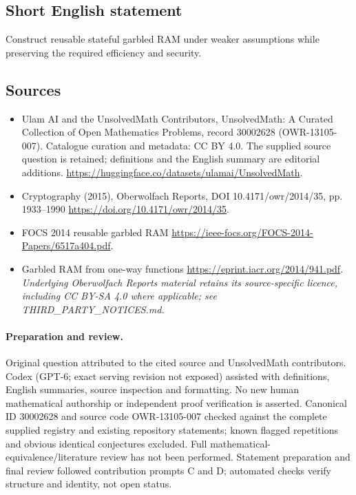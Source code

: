 \documentclass[11pt]{article}
\begin{document}
\subsection{Short English statement}
Construct reusable stateful garbled RAM under weaker assumptions while preserving the required efficiency and security.
\subsection{Sources}
\begin{itemize}
\item[\hypertarget{source:30002628:1}{S1}] Ulam AI and the UnsolvedMath Contributors, UnsolvedMath: A Curated Collection of Open Mathematics Problems, record 30002628 (OWR-13105-007). Catalogue curation and metadata: CC BY 4.0. The supplied source question is retained; definitions and the English summary are editorial additions.
\url{https://huggingface.co/datasets/ulamai/UnsolvedMath}.
\item[\hypertarget{source:30002628:2}{S2}] Cryptography (2015), Oberwolfach Reports, DOI 10.4171/owr/2014/35, pp. 1933--1990
\url{https://doi.org/10.4171/owr/2014/35}.
\item[\hypertarget{source:30002628:3}{S3}] FOCS 2014 reusable garbled RAM
\url{https://ieee-focs.org/FOCS-2014-Papers/6517a404.pdf}.
\item[\hypertarget{source:30002628:4}{S4}] Garbled RAM from one-way functions
\url{https://eprint.iacr.org/2014/941.pdf}.
\textit{Underlying Oberwolfach Reports material retains its source-specific licence, including CC BY-SA 4.0 where applicable; see THIRD\_PARTY\_NOTICES.md.}
\end{itemize}
\paragraph{Preparation and review.}
Original question attributed to the cited source and UnsolvedMath contributors. Codex (GPT-6; exact serving revision not exposed) assisted with definitions, English summaries, source inspection and formatting. No new human mathematical authorship or independent proof verification is asserted. Canonical ID 30002628 and source code OWR-13105-007 checked against the complete supplied registry and existing repository statements; known flagged repetitions and obvious identical conjectures excluded. Full mathematical-equivalence/literature review has not been performed. Statement preparation and final review followed contribution prompts C and D; automated checks verify structure and identity, not open status.
\label{end:30002628}
\end{document}
